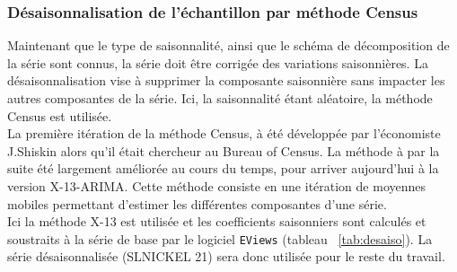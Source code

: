 \subsubsection{Désaisonnalisation de l'échantillon par méthode Census}
Maintenant que le type de saisonnalité, ainsi que le schéma de décomposition de la série sont connus, la série doit être corrigée des variations saisonnières. La 
désaisonnalisation vise à supprimer la composante saisonnière sans impacter les autres composantes de la série. Ici, la saisonnalité étant aléatoire, la méthode Census
est utilisée.\\[11pt]
La première itération de la méthode Census, à été développée par l'économiste J.Shiskin alors qu'il était chercheur au Bureau of Census. La méthode à par la suite été 
largement améliorée au cours du temps, pour arriver aujourd'hui à la version X-13-ARIMA. Cette méthode consiste en une itération de moyennes mobiles permettant d'estimer
les différentes composantes d'une série.\\[11pt]
Ici la méthode X-13 est utilisée et les coefficients saisonniers sont calculés et soustraits à la série de base par le logiciel \texttt{EViews} 
(tableau ~\ref{tab:desaiso}). La série désaisonnalisée (SLNICKEL 21) sera donc utilisée pour le reste du travail.